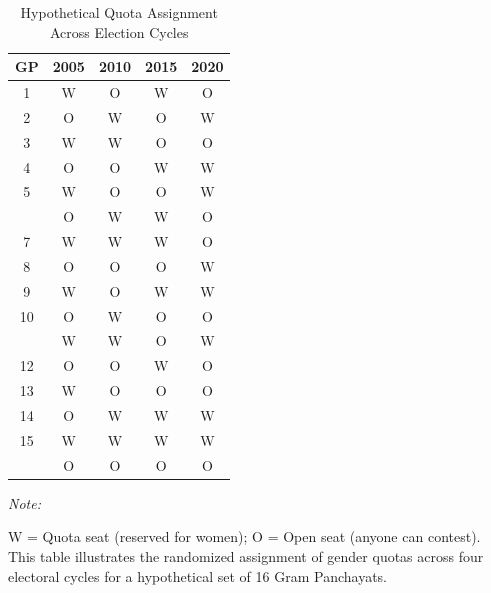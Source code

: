 \begin{table}[!h]
\centering
\caption{\label{tab:treat_status}Hypothetical Quota Assignment Across Election Cycles}
\centering
\fontsize{8}{10}\selectfont
\begin{threeparttable}
\begin{tabular}[t]{ccccc}
\toprule
GP & 2005 & 2010 & 2015 & 2020\\
\midrule
1 & W & O & W & O\\
2 & O & W & O & W\\
3 & W & W & O & O\\
4 & O & O & W & W\\
5 & W & O & O & W\\
\addlinespace
6 & O & W & W & O\\
7 & W & W & W & O\\
8 & O & O & O & W\\
9 & W & O & W & W\\
10 & O & W & O & O\\
\addlinespace
11 & W & W & O & W\\
12 & O & O & W & O\\
13 & W & O & O & O\\
14 & O & W & W & W\\
15 & W & W & W & W\\
\addlinespace
16 & O & O & O & O\\
\bottomrule
\end{tabular}
\begin{tablenotes}
\item \textit{Note: } 
\item W = Quota seat (reserved for women); O = Open seat (anyone can contest). This table illustrates the randomized assignment of gender quotas across four electoral cycles for a hypothetical set of 16 Gram Panchayats.
\end{tablenotes}
\end{threeparttable}
\end{table}
